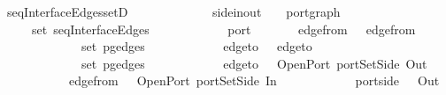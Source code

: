 \ seqInterfaceEdges{\isacharunderscore}setD{\isacharcolon}\isanewline
\ \ \ \ \ \ \ \ \ \ {\isacharcolon}{\isacharcolon}\ {\isachardoublequoteopen}{\isacharparenleft}\ {\isacharcolon}{\isacharcolon}\ side{\isacharunderscore}in{\isacharunderscore}out{\isacharcomma}\ \ \ \ port{\isacharunderscore}graph{\isachardoublequoteclose}\isanewline
\ \ \ {\isachardoublequoteopen}\ {\isasymin}\ set\ {\isacharparenleft}seqInterfaceEdges\ \isanewline
\ \ \ \ \ \ \ \ {\isacharcolon}{\isacharcolon}\ {\isachardoublequoteopen}{\isacharparenleft}\ \ port{\isachardoublequoteclose}\isanewline
\ \ \ \ \ \ \ {\isachardoublequoteopen}edge{\isacharunderscore}from\ \ {\isacharequal}\ edge{\isacharunderscore}from\ \isanewline
\ \ \ \ \ \ \ \ \ \ \ {\isachardoublequoteopen}\ {\isasymin}\ set\ {\isacharparenleft}pg{\isacharunderscore}edges\ \isanewline
\ \ \ \ \ \ \ \ \ \ \ {\isachardoublequoteopen}edge{\isacharunderscore}to\ \ {\isacharequal}\ edge{\isacharunderscore}to\ \isanewline
\ \ \ \ \ \ \ \ \ \ \ {\isachardoublequoteopen}\ {\isasymin}\ set\ {\isacharparenleft}pg{\isacharunderscore}edges\ \isanewline
\ \ \ \ \ \ \ \ \ \ \ {\isachardoublequoteopen}edge{\isacharunderscore}to\ \ {\isacharequal}\ OpenPort\ {\isacharparenleft}portSetSide\ Out\ \isanewline
\ \ \ \ \ \ \ \ \ \ \ {\isachardoublequoteopen}edge{\isacharunderscore}from\ \ {\isacharequal}\ OpenPort\ {\isacharparenleft}portSetSide\ In\ \isanewline
\ \ \ \ \ \ \ \ \ \ \ {\isachardoublequoteopen}port{\isachardot}side\ \ {\isacharequal}\ Out{\isachardoublequoteclose}
